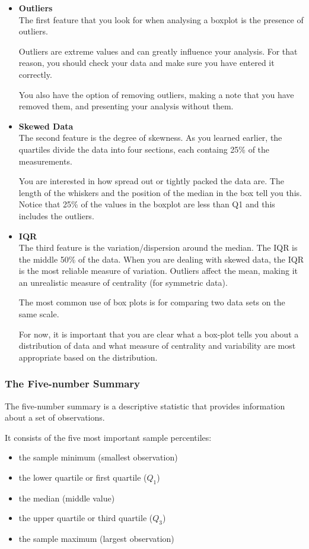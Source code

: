 ﻿\documentclass[]{report}
\begin{document}
\begin{itemize} 
\item \textbf{Outliers}\\
The first feature that you look for when analysing a boxplot is the presence of outliers.

Outliers are extreme values and can greatly influence your analysis. For that reason, you should check your data and make sure you have entered it correctly.

You also have the option of removing outliers, making a note that you have removed them, and presenting your analysis without them.

\item \textbf{Skewed Data} \\
The second feature is the degree of skewness. As you learned earlier, the quartiles divide the data into four sections, each containg 25\% of the measurements. 

You are interested in how spread out or tightly packed the data are. The length of the whiskers and the position of the median in the box tell you this. Notice that 25\% of the values in the boxplot are less than Q1 and this includes the outliers.


\item \textbf{IQR} \\
The third feature is the variation/dispersion around the median. The IQR is the middle 50\% of the data. When you are dealing with skewed data, the IQR is the most reliable measure of variation. Outliers affect the mean, making it an unrealistic measure of centrality (for symmetric data).

The most common use of box plots is for comparing two data sets on the same scale. 

For now, it is important that you are clear what a box-plot tells you about a distribution of data and what measure of centrality and variability are most appropriate based on the distribution.

\end{itemize} 
\subsubsection{The Five-number Summary}

The five-number summary is a descriptive statistic that provides information about a set of observations. 

It consists of the five most important sample percentiles:
\begin{itemize}
\item the sample minimum (smallest observation)
\item the lower quartile or first quartile ($Q_1$)
\item the median (middle value)
\item the upper quartile or third quartile ($Q_3$)
\item the sample maximum (largest observation)
\end{itemize}
\end{document}
